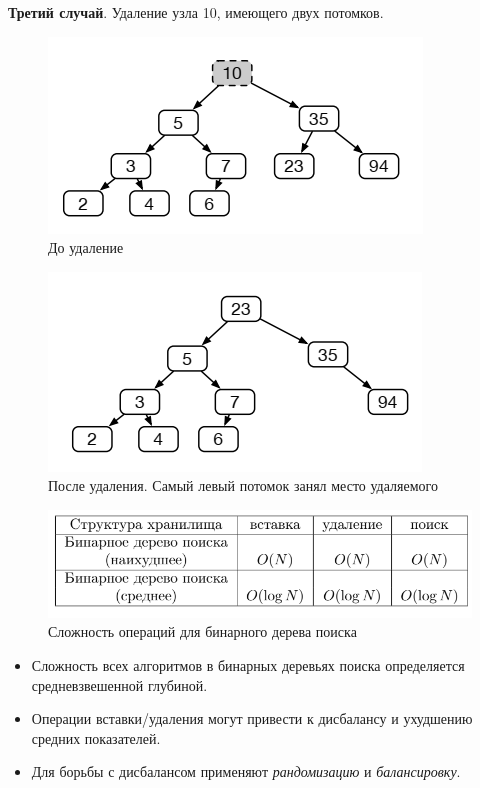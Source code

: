 \documentclass{beamer}
\begin{document}
\begin{frame}[fragile]
	\textbf{Третий случай}. Удаление узла 10, имеющего двух потомков.
	\begin{figure}[h]
		\centering
		\includegraphics[scale=0.5]{images/lec07-pic09.png}
		\caption{До удаление}
	\end{figure}
	\begin{figure}[h]
		\centering
		\includegraphics[scale=0.5]{images/lec07-pic10.png}
		\caption{После удаления. Самый левый потомок занял место удаляемого}
	\end{figure}	
\end{frame}

\begin{frame}[fragile]
	\begin{figure}[h]
		\centering
		\includegraphics[scale=0.5]{images/lec07-pic11.png}
		\caption{Сложность операций для бинарного дерева поиска}
	\end{figure}
	
	\begin{itemize}
		\item Сложность всех алгоритмов в бинарных деревьях поиска определяется средневзвешенной глубиной. 
		\item Операции вставки/удаления могут привести к дисбалансу и ухудшению средних показателей. 
		\item Для борьбы с дисбалансом применяют \textit{рандомизацию} и \textit{балансировку}.
	\end{itemize}
\end{frame}
\end{document}

